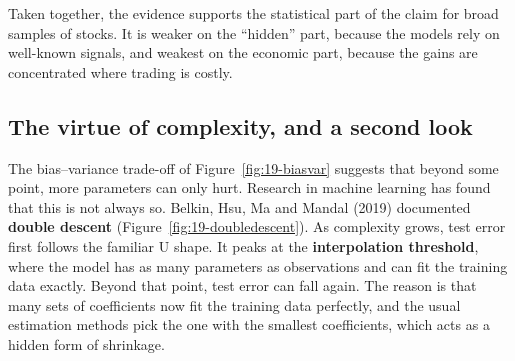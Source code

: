 Taken together, the evidence supports the statistical part of the claim for broad samples of stocks. It is weaker on the ``hidden'' part, because the models rely on well-known signals, and weakest on the economic part, because the gains are concentrated where trading is costly.

\subsection{The virtue of complexity, and a second look}
\label{sec:19-complexity}

The bias--variance trade-off of Figure~\ref{fig:19-biasvar} suggests that beyond some point, more parameters can only hurt. Research in machine learning has found that this is not always so. Belkin, Hsu, Ma and Mandal (2019) documented \textbf{double descent} (Figure~\ref{fig:19-doubledescent}). As complexity grows, test error first follows the familiar U shape. It peaks at the \textbf{interpolation threshold}, where the model has as many parameters as observations and can fit the training data exactly. Beyond that point, test error can fall again. The reason is that many sets of coefficients now fit the training data perfectly, and the usual estimation methods pick the one with the smallest coefficients, which acts as a hidden form of shrinkage.


